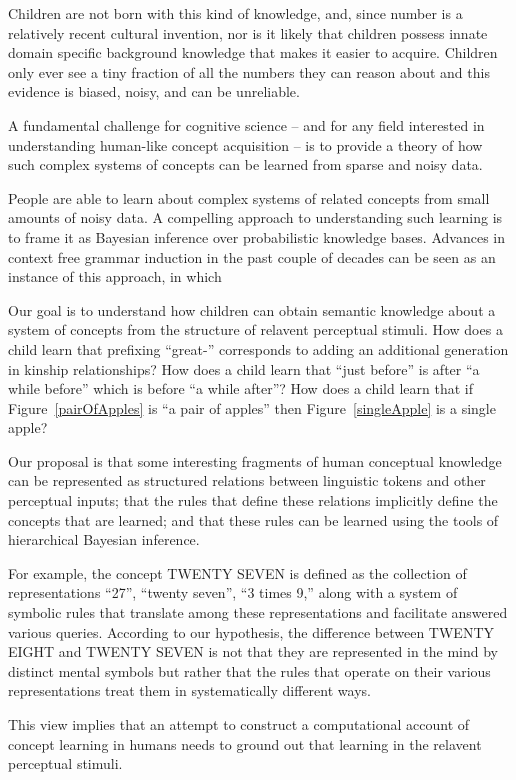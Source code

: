 \documentclass[11pt, twocolumn]{article}
\begin{document}
Children are not born with this kind of knowledge, and, since number
is a relatively recent cultural invention, nor is it likely that
children possess innate domain specific background knowledge that
makes it easier to acquire. Children only ever see a tiny fraction of
all the numbers they can reason about and this evidence is biased,
noisy, and can be unreliable. 

A fundamental challenge for cognitive science -- and for any field
interested in understanding human-like concept acquisition -- is to
provide a theory of how such complex systems of concepts can be
learned from sparse and noisy data.

People are able to learn about complex systems of related
concepts from small amounts of noisy data. A compelling approach to
understanding such learning is to frame it as Bayesian inference over
probabilistic knowledge bases. Advances in context free grammar
induction in the past couple of decades can be seen as an instance of
this approach, in which

Our goal is to understand how children can obtain semantic knowledge
about a system of concepts from the structure of relavent perceptual
stimuli. How does a child learn that prefixing ``great-'' corresponds
to adding an additional generation in kinship relationships? How does
a child learn that ``just before'' is after ``a while before'' which
is before ``a while after''? How does a child learn that if
Figure~\ref{pairOfApples} is ``a pair of apples'' then
Figure~\ref{singleApple} is a single apple? 

Our proposal is that some interesting fragments of human conceptual
knowledge can be represented as structured relations between
linguistic tokens and other perceptual inputs; that the rules that
define these relations implicitly define the concepts that are
learned; and that these rules can be learned using the tools of
hierarchical Bayesian inference. 

For example, the concept TWENTY SEVEN is defined as the collection of
representations ``27'', ``twenty seven'', ``3 times 9,'' along with a
system of symbolic rules that translate among these representations
and facilitate answered various queries. According to our hypothesis,
the difference between TWENTY EIGHT and TWENTY SEVEN is not that they
are represented in the mind by distinct mental symbols but rather that
the rules that operate on their various representations treat them in
systematically different ways.

This view implies that an attempt to construct a computational account
of concept learning in humans needs to ground out that learning in the
relavent perceptual stimuli. 
\end{document}
